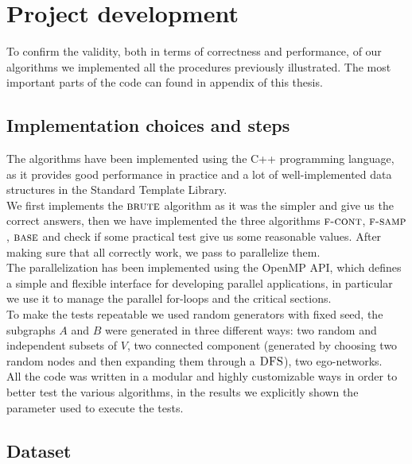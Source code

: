 
\chapter{Project development}
    
    To confirm the validity, both in terms of correctness and performance, of our algorithms we implemented all the procedures previously illustrated. 
    The most important parts of the code can found in appendix of this thesis.
    
    \section{Implementation choices and steps}
    
    The algorithms have been implemented using the C++ programming language, 
    as it provides good performance in practice and a lot of well-implemented data structures in the Standard Template Library.\\
    
    We first implements the $\textsc{brute}$ algorithm as it was the simpler and give us the correct answers, then we have implemented the three algorithms $\textsc{f-cont}$, $\textsc{f-samp}$, $\textsc{base}$ and check if some practical test give us some reasonable values.
    After making sure that all correctly work, we pass to parallelize them.\\
    
    The parallelization has been implemented using the OpenMP API\cite{openmp}, which defines a simple and flexible interface for developing parallel applications, in particular we use it to manage the parallel for-loops and the critical sections.\\
    
    To make the tests repeatable we used random generators with fixed seed, the subgraphs $A$ and $B$ were generated in three different ways: two random and independent subsets of $V$, two connected component (generated by choosing two random nodes and then expanding them through a $\textsc{DFS}$), two ego-networks.\\
    
    All the code was written in a modular and highly customizable ways in order
    to better test the various algorithms, in the results we explicitly shown the parameter used to execute the tests.
    
    \clearpage
    \section{Dataset}
    
